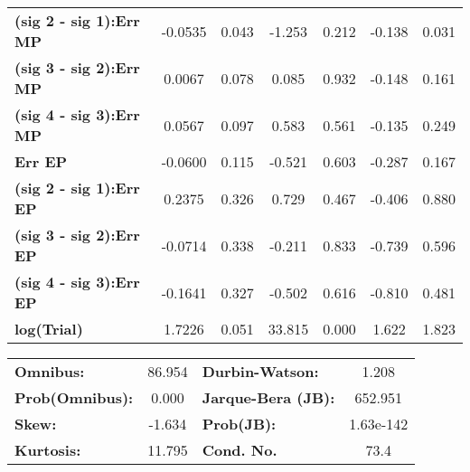 \begin{center}
\begin{tabular}{lcccccc}
\textbf{(sig 2 - sig 1):Err MP} &      -0.0535  &        0.043     &    -1.253  &         0.212        &       -0.138    &        0.031     \\
\textbf{(sig 3 - sig 2):Err MP} &       0.0067  &        0.078     &     0.085  &         0.932        &       -0.148    &        0.161     \\
\textbf{(sig 4 - sig 3):Err MP} &       0.0567  &        0.097     &     0.583  &         0.561        &       -0.135    &        0.249     \\
\textbf{Err EP}                 &      -0.0600  &        0.115     &    -0.521  &         0.603        &       -0.287    &        0.167     \\
\textbf{(sig 2 - sig 1):Err EP} &       0.2375  &        0.326     &     0.729  &         0.467        &       -0.406    &        0.880     \\
\textbf{(sig 3 - sig 2):Err EP} &      -0.0714  &        0.338     &    -0.211  &         0.833        &       -0.739    &        0.596     \\
\textbf{(sig 4 - sig 3):Err EP} &      -0.1641  &        0.327     &    -0.502  &         0.616        &       -0.810    &        0.481     \\
\textbf{log(Trial)}             &       1.7226  &        0.051     &    33.815  &         0.000        &        1.622    &        1.823     \\
\bottomrule
\end{tabular}
\end{center}\begin{center}
\begin{tabular}{lclc}
\toprule
\textbf{Omnibus:}       & 86.954 & \textbf{  Durbin-Watson:     } &     1.208  \\
\textbf{Prob(Omnibus):} &  0.000 & \textbf{  Jarque-Bera (JB):  } &   652.951  \\
\textbf{Skew:}          & -1.634 & \textbf{  Prob(JB):          } & 1.63e-142  \\
\textbf{Kurtosis:}      & 11.795 & \textbf{  Cond. No.          } &      73.4  \\
\bottomrule
\end{tabular}
\end{center}



